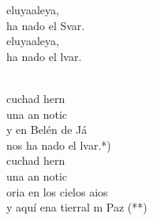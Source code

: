 \begin{cancion}%
	\begin{chorus}%
	eluyaaleya,\\
	ha nado el Svar.\\
	eluyaaleya,\\
	ha nado el lvar.\\
	\end{chorus}%
	\jump\\
	cuchad hern\\
	una an notic \\
	y en Belén de Já\\
	nos ha nado el lvar.*)\\
\jump
	cuchad hern\\
	una an notic  \\
	oria en los cielos aios\\
	y aquí ena tierral m Paz (**)\\
\end{cancion}%
